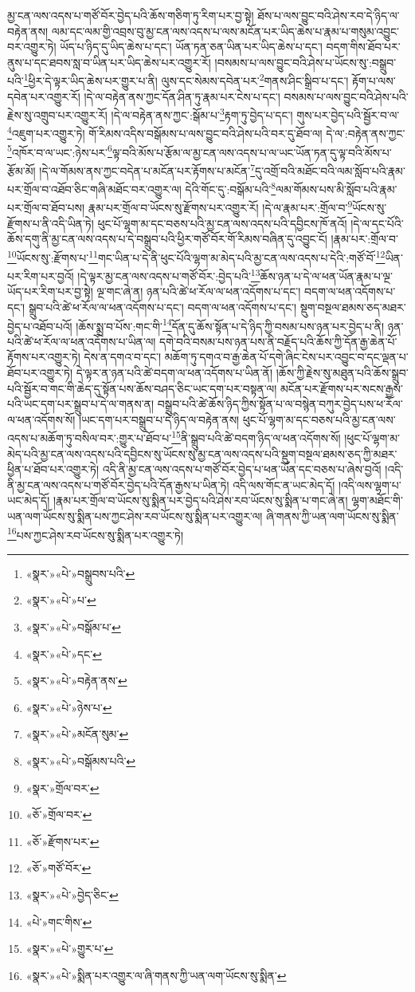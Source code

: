 མྱ་ངན་ལས་འདས་པ་གཙོ་བོར་བྱེད་པའི་ཆོས་གཅིག་ཏུ་རིག་པར་བྱ་སྟེ། ཐོས་པ་ལས་བྱུང་བའི་ཤེས་རབ་དེ་ཉིད་ལ་བརྟེན་ནས། ལམ་དང་ལམ་གྱི་འབྲས་བུ་མྱ་ངན་ལས་འདས་པ་ལས་མངོན་པར་ཡིད་ཆེས་པ་རྣམ་པ་གསུམ་འབྱུང་བར་འགྱུར་ཏེ། ཡོད་པ་ཉིད་དུ་ཡིད་ཆེས་པ་དང་། ཡོན་ཏན་ཅན་ཡིན་པར་ཡིད་ཆེས་པ་དང་། བདག་གིས་ཐོབ་པར་ནུས་པ་དང་ཐབས་སླ་བ་ཡིན་པར་ཡིད་ཆེས་པར་འགྱུར་རོ། །བསམས་པ་ལས་བྱུང་བའི་ཤེས་པ་ཡོངས་སུ་:བསྒྲུབ་པའི་\footnote{«སྣར་»«པེ་»བསྒྲུབས་པའི་}ཕྱིར་དེ་ལྟར་ཡིད་ཆེས་པར་གྱུར་པ་ནི། ལུས་དང་སེམས་དབེན་པར་\footnote{«སྣར་»«པེ་»པ་}གནས་ཤིང་སྒྲིབ་པ་དང་། རྟོག་པ་ལས་དབེན་པར་འགྱུར་རོ། །དེ་ལ་བརྟེན་ནས་ཀྱང་དོན་ཤིན་ཏུ་རྣམ་པར་ངེས་པ་དང་། བསམས་པ་ལས་བྱུང་བའི་ཤེས་པའི་རྗེས་སུ་འགྲུབ་པར་འགྱུར་རོ། །དེ་ལ་བརྟེན་ནས་ཀྱང་:སྒོམ་པ་\footnote{«སྣར་»«པེ་»བསྒོམ་པ་}རྟག་ཏུ་བྱེད་པ་དང་། གུས་པར་བྱེད་པའི་སྦྱོར་བ་ལ་\footnote{«སྣར་»«པེ་»དང་}འཇུག་པར་འགྱུར་ཏེ། གོ་རིམས་འདིས་བསྒོམས་པ་ལས་བྱུང་བའི་ཤེས་པའི་བར་དུ་ཐོབ་ལ། དེ་ལ་:བརྟེན་ནས་ཀྱང་\footnote{«སྣར་»«པེ་»བརྟེན་ནས་}འཁོར་བ་ལ་ཡང་:ཉེས་པར་\footnote{«སྣར་»«པེ་»ཉེས་པ་}ལྟ་བའི་མོས་པ་རྩོམ་ལ་མྱ་ངན་ལས་འདས་པ་ལ་ཡང་ཡོན་ཏན་དུ་ལྟ་བའི་མོས་པ་རྩོམ་མོ། །དེ་ལ་གོམས་ནས་ཀྱང་བདེན་པ་མངོན་པར་རྟོགས་པ་མངོན་\footnote{«སྣར་»«པེ་»མངོན་སུམ་}དུ་འགྲོ་བའི་མཐོང་བའི་ལམ་སློབ་པའི་རྣམ་པར་གྲོལ་བ་འཐོབ་ཅིང་གཞི་མཐོང་བར་འགྱུར་ལ། དེའི་གོང་དུ་:བསྒོམ་པའི་\footnote{«སྣར་»«པེ་»བསྒོམས་པའི་}ལམ་གོམས་པས་མི་སློབ་པའི་རྣམ་པར་གྲོལ་བ་ཐོབ་པས། རྣམ་པར་གྲོལ་བ་ཡོངས་སུ་རྫོགས་པར་འགྱུར་རོ། །དེ་ལ་རྣམ་པར་:གྲོལ་བ་\footnote{«སྣར་»གྲོལ་བར་}ཡོངས་སུ་རྫོགས་པ་ནི་འདི་ཡིན་ཏེ། ཕུང་པོ་ལྷག་མ་དང་བཅས་པའི་མྱ་ངན་ལས་འདས་པའི་དབྱིངས་ཁོ་ནའོ། །དེ་ལ་དང་པོའི་ཆོས་དགུ་ནི་མྱ་ངན་ལས་འདས་པ་དེ་བསྒྲུབ་པའི་ཕྱིར་གཙོ་བོར་གོ་རིམས་བཞིན་དུ་འབྱུང་ངོ། །རྣམ་པར་:གྲོལ་བ་\footnote{«ཅོ་»གྲོལ་བར་}ཡོངས་སུ་:རྫོགས་པ་\footnote{«ཅོ་»རྫོགས་པར་}གང་ཡིན་པ་དེ་ནི་ཕུང་པོའི་ལྷག་མ་མེད་པའི་མྱ་ངན་ལས་འདས་པ་དེའི་:གཙོ་བོ་\footnote{«ཅོ་»གཙོ་བོར་}ཡིན་པར་རིག་པར་བྱའོ། །དེ་ལྟར་མྱ་ངན་ལས་འདས་པ་གཙོ་བོར་:བྱེད་པའི་\footnote{«སྣར་»«པེ་»བྱེད་ཅིང་}ཆོས་ཉན་པ་དེ་ལ་ཕན་ཡོན་རྣམ་པ་ལྔ་ཡོད་པར་རིག་པར་བྱ་སྟེ། ལྔ་གང་ཞེ་ན། ཉན་པའི་ཚེ་ཕ་རོལ་ལ་ཕན་འདོགས་པ་དང་། བདག་ལ་ཕན་འདོགས་པ་དང་། སྒྲུབ་པའི་ཚེ་ཕ་རོལ་ལ་ཕན་འདོགས་པ་དང་། བདག་ལ་ཕན་འདོགས་པ་དང་། སྡུག་བསྔལ་ཐམས་ཅད་མཐར་བྱེད་པ་འཐོབ་པའོ། །ཆོས་སྨྲ་བ་པོས་:གང་གི་\footnote{«པེ་»གང་གིས་}དོན་དུ་ཆོས་སྟོན་པ་དེ་ཉིད་ཀྱི་བསམ་པས་ཉན་པར་བྱེད་པ་ནི། ཉན་པའི་ཚེ་ཕ་རོལ་ལ་ཕན་འདོགས་པ་ཡིན་ལ། དགེ་བའི་བསམ་པས་ཉན་པས་ནི་བརྗོད་པའི་ཆོས་ཀྱི་དོན་རྒྱ་ཆེན་པོ་རྟོགས་པར་འགྱུར་ཏེ། དེས་ན་དགའ་བ་དང་། མཆོག་ཏུ་དགའ་བ་རྒྱ་ཆེན་པོ་དགེ་ཞིང་ངེས་པར་འབྱུང་བ་དང་ལྡན་པ་ཐོབ་པར་འགྱུར་ཏེ། དེ་ལྟར་ན་ཉན་པའི་ཚེ་བདག་ལ་ཕན་འདོགས་པ་ཡིན་ནོ། །ཆོས་ཀྱི་རྗེས་སུ་མཐུན་པའི་ཆོས་སྒྲུབ་པའི་སྦྱོར་བ་གང་གི་ཆེད་དུ་སྟོན་པས་ཆོས་བཤད་ཅིང་ཡང་དག་པར་བསྟན་ལ། མངོན་པར་རྫོགས་པར་སངས་རྒྱས་པའི་ཡང་དག་པར་སྒྲུབ་པ་དེ་ལ་གནས་ན། བསྒྲུབ་པའི་ཚེ་ཆོས་ཉིད་ཀྱིས་སྟོན་པ་ལ་བསྙེན་བཀུར་བྱེད་པས་ཕ་རོལ་ལ་ཕན་འདོགས་སོ། །ཡང་དག་པར་བསྒྲུབ་པ་དེ་ཉིད་ལ་བརྟེན་ནས། ཕུང་པོ་ལྷག་མ་དང་བཅས་པའི་མྱ་ངན་ལས་འདས་པ་མཆོག་ཏུ་བསིལ་བར་:གྱུར་པ་ཐོབ་པ་\footnote{«སྣར་»«པེ་»གྱུར་པ་}ནི་སྒྲུབ་པའི་ཚེ་བདག་ཉིད་ལ་ཕན་འདོགས་སོ། །ཕུང་པོ་ལྷག་མ་མེད་པའི་མྱ་ངན་ལས་འདས་པའི་དབྱིངས་སུ་ཡོངས་སུ་མྱ་ངན་ལས་འདས་པའི་སྡུག་བསྔལ་ཐམས་ཅད་ཀྱི་མཐར་ཕྱིན་པ་ཐོབ་པར་འགྱུར་ཏེ། འདི་ནི་མྱ་ངན་ལས་འདས་པ་གཙོ་བོར་བྱེད་པ་ཕན་ཡོན་དང་བཅས་པ་ཞེས་བྱའོ། །འདི་ནི་མྱ་ངན་ལས་འདས་པ་གཙོ་བོར་བྱེད་པའི་དོན་རྒྱས་པ་ཡིན་ཏེ། འདི་ལས་གོང་ན་ཡང་མེད་དོ། །འདི་ལས་ལྷག་པ་ཡང་མེད་དོ། །རྣམ་པར་གྲོལ་བ་ཡོངས་སུ་སྨིན་པར་བྱེད་པའི་ཤེས་རབ་ཡོངས་སུ་སྨིན་པ་གང་ཞེ་ན། ལྷག་མཐོང་གི་ཡན་ལག་ཡོངས་སུ་སྨིན་པས་ཀྱང་ཤེས་རབ་ཡོངས་སུ་སྨིན་པར་འགྱུར་ལ། ཞི་གནས་ཀྱི་ཡན་ལག་ཡོངས་སུ་སྨིན་\footnote{«སྣར་»«པེ་»སྨིན་པར་འགྱུར་ལ་ཞི་གནས་ཀྱི་ཡན་ལག་ཡོངས་སུ་སྨིན་}པས་ཀྱང་ཤེས་རབ་ཡོངས་སུ་སྨིན་པར་འགྱུར་ཏེ། 
